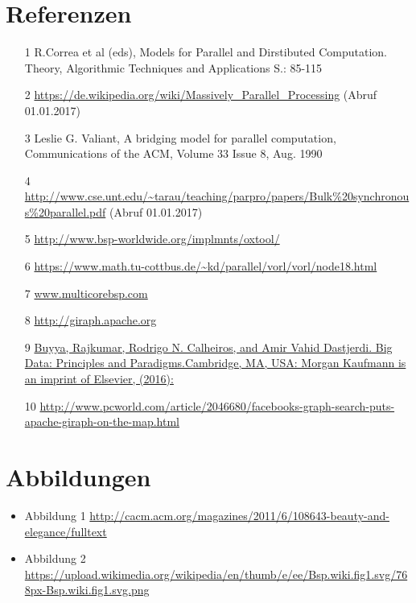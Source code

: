 \documentclass[a4paper,10pt]{scrartcl}
\begin{document}
\section{Referenzen}
\begin{itemize}
\item [1] R.Correa et al (eds), Models for Parallel and Dirstibuted Computation. Theory, Algorithmic Techniques and Applications S.: 85-115
\item [2] \url{https://de.wikipedia.org/wiki/Massively_Parallel_Processing} (Abruf 01.01.2017)
\item [3] Leslie G. Valiant, A bridging model for parallel computation, Communications of the ACM, Volume 33 Issue 8, Aug. 1990 
\item [4] \url{http://www.cse.unt.edu/~tarau/teaching/parpro/papers/Bulk%20synchronous%20parallel.pdf} (Abruf 01.01.2017)
\item [5] \url{http://www.bsp-worldwide.org/implmnts/oxtool/}
\item [6] \url{https://www.math.tu-cottbus.de/~kd/parallel/vorl/vorl/node18.html}
\item [7] \url{www.multicorebsp.com}
\item [8] \url{http://giraph.apache.org}
\item [9] \url{Buyya, Rajkumar, Rodrigo N. Calheiros, and Amir Vahid Dastjerdi. Big Data: Principles and Paradigms.Cambridge, MA, USA: Morgan Kaufmann is an imprint of Elsevier, (2016):}
\item [10] \url{http://www.pcworld.com/article/2046680/facebooks-graph-search-puts-apache-giraph-on-the-map.html}
\end{itemize}
\section{Abbildungen}
\begin{itemize}
\item Abbildung 1 \url{http://cacm.acm.org/magazines/2011/6/108643-beauty-and-elegance/fulltext}
\item Abbildung 2 \url{https://upload.wikimedia.org/wikipedia/en/thumb/e/ee/Bsp.wiki.fig1.svg/768px-Bsp.wiki.fig1.svg.png}
       
\end{itemize}
\end{document}
